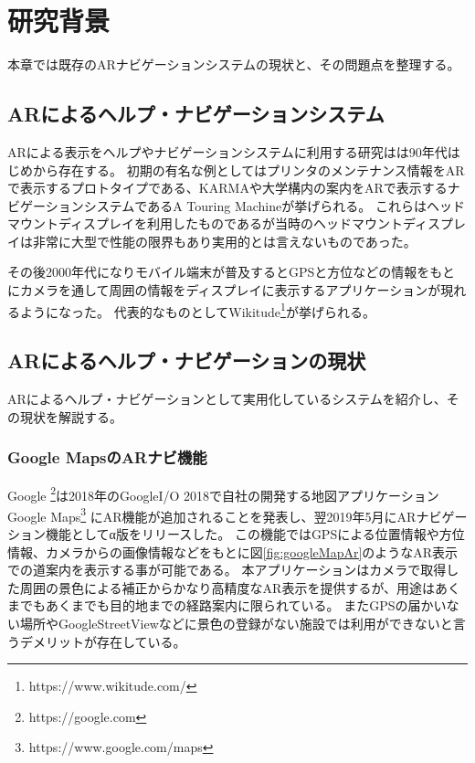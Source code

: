 \chapter{研究背景}
\label{chap:background}

本章では既存のARナビゲーションシステムの現状と、その問題点を整理する。

\newpage


\section{ARによるヘルプ・ナビゲーションシステム}
ARによる表示をヘルプやナビゲーションシステムに利用する研究はは90年代はじめから存在する。
初期の有名な例としてはプリンタのメンテナンス情報をARで表示するプロトタイプである、KARMA\cite{10.1145/159544.159587}や大学構内の案内をARで表示するナビゲーションシステムであるA Touring Machine\cite{629922}が挙げられる。
これらはヘッドマウントディスプレイを利用したものであるが当時のヘッドマウントディスプレイは非常に大型で性能の限界もあり実用的とは言えないものであった。

その後2000年代になりモバイル端末が普及するとGPSと方位などの情報をもとにカメラを通して周囲の情報をディスプレイに表示するアプリケーションが現れるようになった。
代表的なものとしてWikitude\footnote{\textsf{https://www.wikitude.com/}}が挙げられる。


\section{ARによるヘルプ・ナビゲーションの現状}
\label{current}
ARによるヘルプ・ナビゲーションとして実用化しているシステムを紹介し、その現状を解説する。

\subsection{Google MapsのARナビ機能}
Google \footnote{\textsf{https://google.com}}は2018年のGoogleI/O 2018で自社の開発する地図アプリケーションGoogle Maps\footnote{\textsf{https://www.google.com/maps}} にAR機能が追加されることを発表し、翌2019年5月にARナビゲーション機能としてα版をリリースした。
この機能ではGPSによる位置情報や方位情報、カメラからの画像情報などをもとに図\ref{fig:googleMapAr}のようなAR表示での道案内を表示する事が可能である。
本アプリケーションはカメラで取得した周囲の景色による補正からかなり高精度なAR表示を提供するが、用途はあくまでもあくまでも目的地までの経路案内に限られている。
またGPSの届かいない場所やGoogleStreetViewなどに景色の登録がない施設では利用ができないと言うデメリットが存在している。

